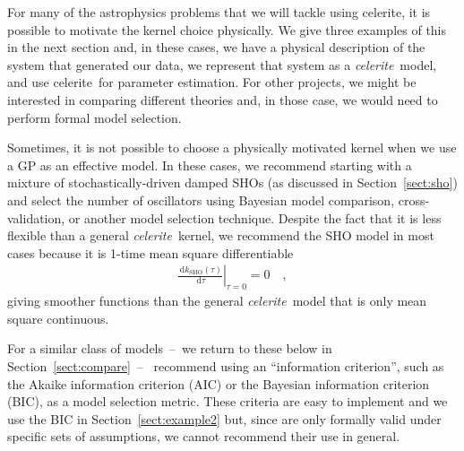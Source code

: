 \documentclass[manuscript, letterpaper]{aastex6}
\makeatletter
\let\origsection\section
\renewcommand\section{\@ifstar{\starsection}{\nostarsection}}
\newcommand\nostarsection[1]{\sectionprelude\origsection{#1}}
\newcommand\starsection[1]{\sectionprelude\origsection*{#1}}
\newcommand\sectionprelude{\vspace{1em}}
\newcommand{\project}[1]{\textsf{#1}}
\newcommand{\celerite}{\project{celerite}}
\newcommand{\celeriteterm}{\emph{celerite}}
\newcommand{\sectionname}{Section}
\newcommand{\sectref}[1]{\ref{sect:#1}}
\newcommand{\Sect}[1]{\sectionname~\sectref{#1}}
\newcommand{\sect}[1]{\Sect{#1}}
\newcommand{\sectlabel}[1]{\label{sect:#1}}
\newcommand{\dd}{\ensuremath{\,\mathrm{d}}}
\makeatother
\begin{document}
For many of the astrophysics problems that we will tackle using \celerite, it
is possible to motivate the kernel choice physically.
We give three examples of this in the next section and, in these cases, we
have a physical description of the system that generated our data, we
represent that system as a \celeriteterm\ model, and use \celerite\ for
parameter estimation.
For other projects, we might be interested in comparing different theories
and, in those case, we would need to perform formal model selection.

Sometimes, it is not possible to choose a physically motivated kernel when we
use a GP as an effective model.
In these cases, we recommend starting with a mixture of stochastically-driven
damped SHOs (as discussed in \sect{sho}) and select the number of oscillators
using Bayesian model comparison, cross-validation, or another model selection
technique.
Despite the fact that it is less flexible than a general \celeriteterm\
kernel, we recommend the SHO model in most cases because it is 1-time mean
square differentiable
\begin{eqnarray}
\left.\frac{\dd k_\mathrm{SHO}(\tau)}{\dd \tau}\right|_{\tau=0} = 0 \quad,
\end{eqnarray}
giving smoother functions than the general \celeriteterm\ model that is only
mean square continuous.

For a similar class of models~--~we return to these below in
\sect{compare}~--~\citet{Kelly:2014} recommend using an ``information
criterion'', such as the Akaike information criterion (AIC) or the Bayesian
information criterion (BIC), as a model selection metric.
These criteria are easy to implement and we use the BIC in \sect{example2}
but, since are only formally valid under specific sets of assumptions, we
cannot recommend their use in general.


\section{Examples}\sectlabel{examples}
\end{document}
